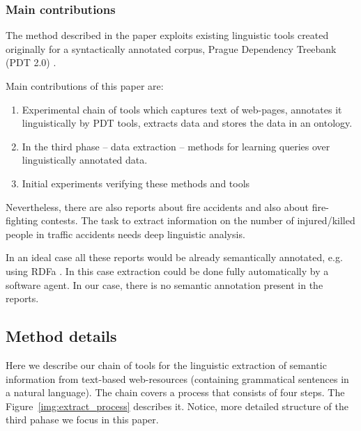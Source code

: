 \subsubsection{Main contributions}

The method described in the paper exploits existing linguistic tools created originally for a syntactically annotated corpus, Prague Dependency Treebank (PDT 2.0) \citep{biblio:PDT20_CD}.

Main contributions of this paper are: 
 
\begin{enumerate}
\item  Experimental chain of tools which captures text of web-pages, annotates it linguistically by PDT tools, extracts data and stores the data in an ontology. %
\item  In the third phase -- data extraction -- methods for learning queries over linguistically annotated data. 
\item Initial experiments verifying these methods and tools
\end{enumerate}
 
Nevertheless, there are also reports about fire accidents and also about fire-fighting contests. The task to extract information on the number of injured/killed people in traffic accidents needs deep linguistic analysis.

In an ideal case all these reports would be already semantically annotated, e.g. using RDFa \citep{biblio:RDFa}. In this case extraction could be done fully automatically by a software agent. In our case, there is no semantic annotation present in the reports.





\subsection{Method details}

Here we describe our chain of tools for the linguistic extraction of semantic information from text-based web-resources (containing grammatical sentences in a natural language). The chain covers a process that consists of four steps. The Figure~\ref{img:extract_process} describes it. Notice, more detailed structure of the third pahase we focus in this paper.

